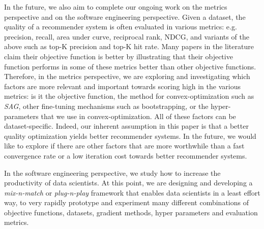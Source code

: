 In the future, we also aim to complete our ongoing work on the metrics perspective and on the software engineering perspective.  
Given a dataset, the quality of a recommender system is often evaluated in various metrics: 
e.g. precision, recall, area under curve, reciprocal rank, NDCG, and variants of the above such as top-K precision and top-K hit rate.
Many papers in the literature claim their objective function is better by illustrating that their objective function performs in some of these metrics better than other objective functions.  
Therefore, in the metrics perspective, we are exploring and investigating which factors are more relevant and important towards scoring high in the various metrics: 
is it the objective function, the method for convex-optimization such as \emph{SAG}, other fine-tuning mechanisms such as bootstrapping, 
or the hyper-parameters that we use in convex-optimization.  All of these factors can be dataset-specific.  
Indeed, our inherent assumption in this paper is that a better quality optimization yields better recommender systems. 
In the future, we would like to explore if there are other factors that are more worthwhile than a fast convergence rate or a low iteration cost towards better recommender systems.  

In the software engineering perspective, we study how to increase the productivity of data scientists.  
At this point, we are designing and developing a \emph{mix-n-match} or \emph{plug-n-play} framework that enables data scientists in a least effort way, 
to very rapidly prototype and experiment many different combinations of objective functions, datasets, gradient methods, hyper parameters and evaluation metrics.  
